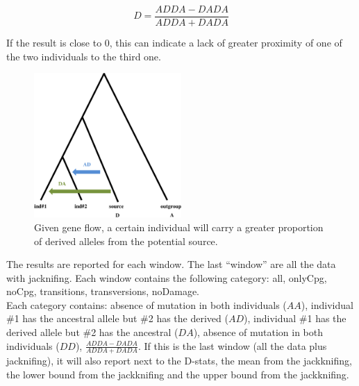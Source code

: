 \documentclass[a4paper]{article}
\begin{document}
\[
D= \frac {ADDA-DADA} {ADDA+DADA}
\]


If the result is close to 0, this can indicate a lack of greater proximity of one of the two individuals to the third one. 




\begin{figure}[!tpb]%
\centerline{\includegraphics[width=0.5\textwidth,natwidth=510,natheight=542]{dstatnowhite.eps}}
\caption{Given gene flow, a certain individual will carry a greater proportion of derived alleles from the potential source.}
\label{fig:dstat}
\end{figure}

%

The results are reported for each window. The last ``window'' are all the data with jacknifing. Each window contains the following category: all, onlyCpg, noCpg, transitions, transversions, noDamage.\\

Each category contains: absence of mutation in both individuals ($AA$), individual \#1 has the ancestral allele but \#2 has the derived  ($AD$), individual \#1 has the derived allele but \#2 has the ancestral  ($DA$), absence of mutation in both individuals ($DD$),  $\frac {ADDA-DADA} {ADDA+DADA}$. If this is the last window (all the data plus jacknifing), it will also report next to the D-stats, the mean from the jackknifing, the lower bound from the jackknifing and the upper bound from the jackknifing.
\end{document}
